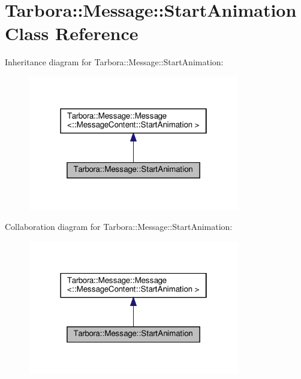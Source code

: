 \hypertarget{classTarbora_1_1Message_1_1StartAnimation}{}\section{Tarbora\+:\+:Message\+:\+:Start\+Animation Class Reference}
\label{classTarbora_1_1Message_1_1StartAnimation}


Inheritance diagram for Tarbora\+:\+:Message\+:\+:Start\+Animation\+:
\nopagebreak
\begin{figure}[H]
\begin{center}
\leavevmode
\includegraphics[width=262pt]{classTarbora_1_1Message_1_1StartAnimation__inherit__graph}
\end{center}
\end{figure}


Collaboration diagram for Tarbora\+:\+:Message\+:\+:Start\+Animation\+:
\nopagebreak
\begin{figure}[H]
\begin{center}
\leavevmode
\includegraphics[width=262pt]{classTarbora_1_1Message_1_1StartAnimation__coll__graph}
\end{center}
\end{figure}
